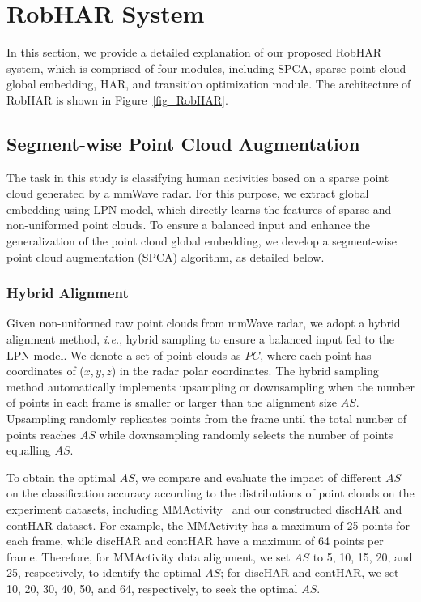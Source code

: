 \section{RobHAR System}
\label{sec: RobHAR}
In this section, we provide a detailed explanation of our proposed RobHAR system, which is comprised of four modules, including SPCA, sparse point cloud global embedding, HAR, and transition optimization module. 
The architecture of RobHAR is shown in Figure~\ref{fig_RobHAR}.



\subsection{Segment-wise Point Cloud Augmentation}
\label{sec: SPCA}

The task in this study is classifying human activities based on a sparse point cloud generated by a mmWave radar. 
For this purpose, we extract global embedding using LPN model, which directly learns the features of sparse and non-uniformed point clouds. 
To ensure a balanced input and enhance the generalization of the point cloud global embedding, we develop a segment-wise point cloud augmentation (SPCA) algorithm, as detailed below.

\subsubsection{Hybrid Alignment}

Given non-uniformed raw point clouds from mmWave radar, we adopt a hybrid alignment method, \textit{i.e.}, hybrid sampling to ensure a balanced input fed to the LPN model. 
We denote a set of point clouds as $PC$, where each point has coordinates of ($x, y, z$) in the radar polar coordinates. 
The hybrid sampling method automatically implements upsampling or downsampling when the number of points in each frame is smaller or larger than the alignment size $AS$. Upsampling randomly replicates points from the frame until the total number of points reaches $AS$ while downsampling randomly selects the number of points equalling $AS$. 

To obtain the optimal $AS$, we compare and evaluate the impact of different $AS$ on the classification accuracy according to the distributions of point clouds on the experiment datasets, including MMActivity~\cite{singh2019radhar} and our constructed discHAR and contHAR dataset. For example, the MMActivity has a maximum of 25 points for each frame, while discHAR and contHAR have a maximum of 64 points per frame. Therefore, for MMActivity data alignment, we set $AS$ to 5, 10, 15, 20, and 25, respectively, to identify the optimal $AS$; 
for discHAR and contHAR, we set 10, 20, 30, 40, 50, and 64, respectively, to seek the optimal $AS$.


